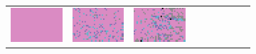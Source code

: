 \documentclass{ipol}
\begin{document}
\begin{figure}[ht]
\begin{subfigure}[t]{\linewidth}
\begin{tabular}{ccccccccc}
                \includegraphics[width=\s]{images/tower/LINEAR/bid_n5_128_grids.png}&
                \includegraphics[width=\s]{images/tower/PPG/bid_n5_128_grids.png}&
                \includegraphics[width=\s]{images/tower/VNG/bid_n5_128_grids.png}\\

\end{tabular}
\end{subfigure}
\end{figure}
\end{document}

